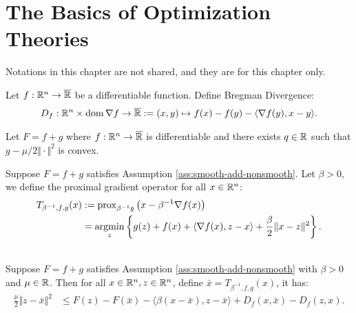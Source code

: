 \documentclass[12pt]{report}
\begin{document}
\chapter{The Basics of Optimization Theories}
    Notations in this chapter are not shared, and they are for this chapter only. 
    \begin{definition}\label{def:bregman-div}
        Let $f:\mathbb R^n \rightarrow \overline {\mathbb R}$ be a differentiable function. 
        Define Bregman Divergence: 
        \begin{align*}
            D_f: \mathbb R^n \times \operatorname{dom} \nabla f \rightarrow \overline {\mathbb R}:= 
            (x, y) \mapsto f(x) - f(y) - \langle \nabla f(y), x - y\rangle. 
        \end{align*}
    \end{definition}
    \begin{assumption}\label{ass:smooth-add-nonsmooth}
        Let $F = f+ g$ where $f:\mathbb R^n \rightarrow \overline {\mathbb R}$ is differentiable and there exists $q\in \mathbb R$ such that $g - \mu/2\Vert \cdot\Vert^2$ is convex.
    \end{assumption}
    \begin{definition}
        Suppose $F = f + g$ satisfies Assumption \ref{ass:smooth-add-nonsmooth}. 
        Let $\beta > 0$, we define the proximal gradient operator for all $x \in \mathbb R^n$: 
        \begin{align*}
            T_{\beta^{-1}, f, g}(x) &:= \operatorname{prox}_{\beta^{-1}g} \left(
                x - \beta^{-1} \nabla f(x)
            \right)
            \\
            &= \mathop{\rm argmin}\limits_{z}\left\lbrace
                g(z) + f(x) + \langle \nabla f(x), z - x\rangle
                + \frac{\beta}{2}\Vert x - z\Vert^2
            \right\rbrace. 
        \end{align*}
    \end{definition}
    \begin{theorem}\;\label{thm:pg-ineq-swcnvx-generic}\\
        Suppose $F = f + g$ satisfies Assumption \ref{ass:smooth-add-nonsmooth} with $\beta > 0$ and $\mu \in \mathbb R$. 
        Then for all $x \in \mathbb R^n, z \in \mathbb R^n$, define $\bar x = T_{\beta^{-1}, f, g}(x)$, it has: 
        \begin{align*}
            \frac{\mu}{2}\Vert z - \bar x\Vert^2 
            &\le 
            F(z) - F(\bar x) - \langle \beta(x - \bar x), z - \bar x\rangle 
            + D_f(x, \bar x ) - D_f(z, x).  
        \end{align*}
    \end{theorem}
\end{document}

